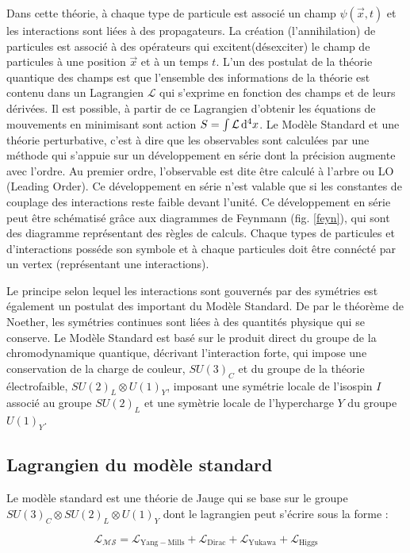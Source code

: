 Dans cette théorie, à chaque type de particule est associé un champ $\psi(\vec{x},t)$ et les interactions sont liées à des propagateurs. La création (l'annihilation) de particules est associé à des opérateurs qui excitent(désexciter) le champ de particules à une position $\vec{x}$ et à un temps $t$. L'un des postulat de la théorie quantique des champs est que l'ensemble des informations de la théorie est contenu dans un Lagrangien $\mathcal{L}$ qui s'exprime en fonction des champs et de leurs dérivées. Il est possible, à partir de ce Lagrangien d'obtenir les équations de mouvements en minimisant sont action $S=\int\mathcal{L}\mathop{}\!\mathrm{d^4}{x}$.
Le Modèle Standard et une théorie perturbative, c'est à dire que les observables sont calculées par une méthode qui s'appuie sur un développement en série dont la précision augmente avec l'ordre. Au premier ordre, l'observable est dite être calculé à l'arbre ou LO (Leading Order). Ce développement en série n'est valable que si les constantes de couplage des interactions reste faible devant l'unité. Ce développement en série peut être schématisé grâce aux diagrammes de Feynmann (fig. \ref{feyn}), qui sont des diagramme représentant des règles de calculs. Chaque types de particules et d'interactions posséde son symbole et à chaque particules doit être connécté par un vertex (représentant une interactions).

Le principe selon lequel les interactions sont gouvernés par des symétries est également un postulat des important du Modèle Standard. De par le théorème de Noether, les symétries continues sont liées à des quantités physique qui se conserve. Le Modèle Standard est basé sur le produit direct du groupe de la chromodynamique quantique, décrivant l'interaction forte, qui impose une conservation de la charge de couleur, $SU(3)_{C}$ et du groupe de la théorie électrofaible, $SU(2)_{L} \otimes U(1)_{Y}$, imposant une symétrie locale de l'isospin $I$ associé au groupe $SU(2)_{L}$ et une symètrie locale de l'hypercharge $Y$ du groupe $U(1)_{Y}$.

\subsection{Lagrangien du modèle standard}
Le modèle standard est une théorie de Jauge qui se base sur le groupe $SU(3)_{C} \otimes SU(2)_{L} \otimes U(1)_{Y}$ dont le lagrangien peut s'écrire sous la forme :

\begin{equation}
\mathcal{L_{MS}}=\mathcal{L}_{\mathrm{Yang-Mills}}+\mathcal{L}_{\mathrm{Dirac}}+\mathcal{L}_{\mathrm{Yukawa}}+\mathcal{L}_{\mathrm{Higgs}}
\end{equation}

